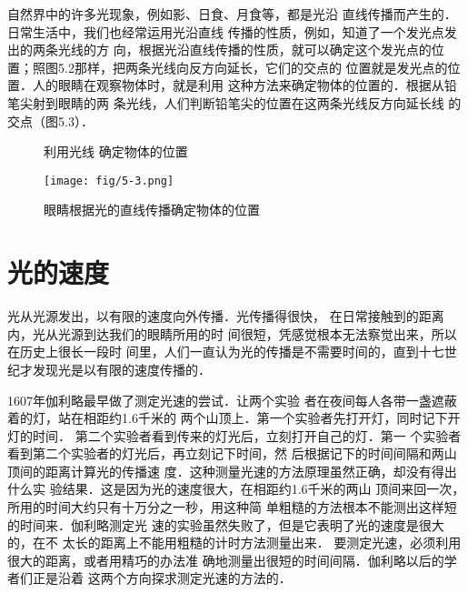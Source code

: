 自然界中的许多光现象，例如影、日食、月食等，都是光沿
直线传播而产生的．日常生活中，我们也经常运用光沿直线
传播的性质，例如，知道了一个发光点发出的两条光线的方
向，根据光沿直线传播的性质，就可以确定这个发光点的位
置；照图5.2那样，把两条光线向反方向延长，它们的交点的
位置就是发光点的位置．人的眼睛在观察物体时，就是利用
这种方法来确定物体的位置的．根据从铅笔尖射到眼睛的两
条光线，人们判断铅笔尖的位置在这两条光线反方向延长线
的交点（图5.3）．
\begin{figure}[htp]
    \centering
    \begin{minipage}[t]{0.48\textwidth}
    \centering
{}
    \caption{利用光线
    确定物体的位置}
    \end{minipage}
    \begin{minipage}[t]{0.48\textwidth}
    \centering
    \texttt{[image: fig/5-3.png]}
    \caption{眼睛根据光的直线传播确定物体的位置}
    \end{minipage}
    \end{figure}

\section{光的速度}
光从光源发出，以有限的速度向外传播．光传播得很快，
在日常接触到的距离内，光从光源到达我们的眼睛所用的时
间很短，凭感觉根本无法察觉出来，所以在历史上很长一段时
间里，人们一直认为光的传播是不需要时间的，直到十七世
纪才发现光是以有限的速度传播的．

1607年伽利略最早做了测定光速的尝试．让两个实验
者在夜间每人各带一盏遮蔽着的灯，站在相距约1.6千米的
两个山顶上．第一个实验者先打开灯，同时记下开灯的时间．
第二个实验者看到传来的灯光后，立刻打开自己的灯．第一
个实验者看到第二个实验者的灯光后，再立刻记下时间，然
后根据记下的时间间隔和两山顶间的距离计算光的传播速
度．这种测量光速的方法原理虽然正确，却没有得出什么实
验结果．这是因为光的速度很大，在相距约1.6千米的两山
顶间来回一次，所用的时间大约只有十万分之一秒，用这种简
单粗糙的方法根本不能测出这样短的时间来．伽利略测定光
速的实验虽然失败了，但是它表明了光的速度是很大的，在不
太长的距离上不能用粗糙的计时方法测量出来．
要测定光速，必须利用很大的距离，或者用精巧的办法准
确地测量出很短的时间间隔．伽利略以后的学者们正是沿着
这两个方向探求测定光速的方法的．

